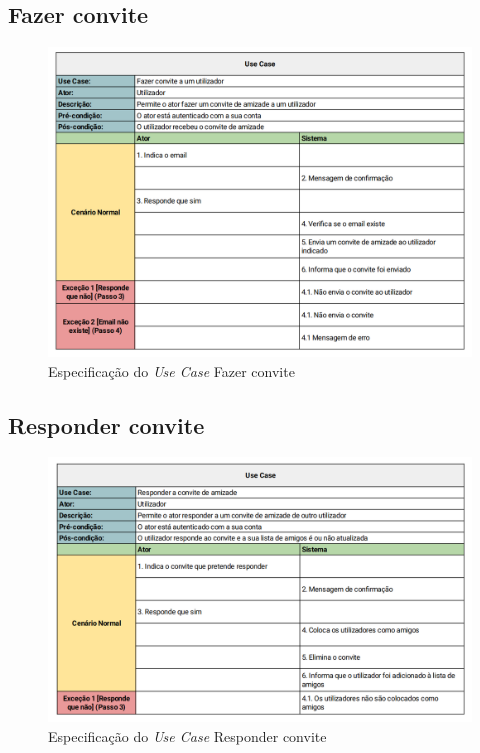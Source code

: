 \documentclass[a4paper]{report}
\begin{document}
\subsection{Fazer convite}
\begin{figure}[H]
	\centering 
    \includegraphics[width=\textwidth]{images/Adicionar_Amigo.png}  
    \caption{Especificação do \emph{Use Case} Fazer convite}
\end{figure}

\subsection{Responder convite}
\begin{figure}[H]
	\centering 
    \includegraphics[width=\textwidth]{images/Responder_Convite.png}  
    \caption{Especificação do \emph{Use Case} Responder convite}
\end{figure}
\end{document}
